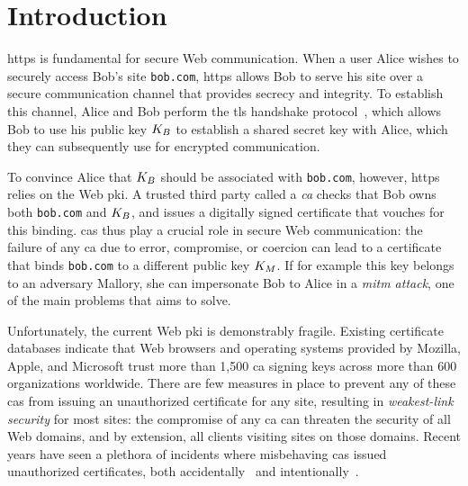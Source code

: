 \section{Introduction}
\label{sec:intro}


\acs{https} is fundamental for secure Web communication. When a user Alice
wishes to securely access Bob's site \texttt{bob.com}, \ac{https} allows Bob to
serve his site over a secure communication channel that provides secrecy and
integrity. To establish this channel, Alice and Bob perform the \ac{tls}
handshake protocol~\cite{rfc5246}, which allows Bob to use his public key
$K_B$ to establish a shared secret key with Alice, which they can subsequently
use for encrypted communication.

To convince Alice that $K_B$ should be associated with \texttt{bob.com},
however, \ac{https} relies on the Web \ac{pki}. A trusted third party called a
\emph{\ac{ca}} checks that Bob owns both \texttt{bob.com} and $K_B$, and
issues a digitally signed certificate that vouches for this binding. \acp{ca}
thus play a crucial role in secure Web communication: the failure of any \ac{ca}
due to error, compromise, or coercion can lead to a certificate that binds
\texttt{bob.com} to a different public key $K_M$. If for example this key
belongs to an adversary Mallory, she can impersonate Bob to Alice in a
\emph{\ac{mitm} attack}, one of the main problems that  aims to solve.

Unfortunately, the current Web \ac{pki} is demonstrably fragile. Existing
certificate databases indicate that Web browsers and operating systems provided
by Mozilla, Apple, and Microsoft trust more than 1,500 \ac{ca} signing keys
across more than 600 organizations worldwide. There are few measures in place to
prevent any of these \acp{ca} from issuing an unauthorized certificate for any
site, resulting in \emph{weakest-link security} for most sites: the compromise
of any \ac{ca} can threaten the security of all Web domains, and by extension,
all clients visiting sites on those domains. Recent years have seen a plethora
of incidents where misbehaving \acp{ca} issued unauthorized certificates, both
accidentally~\cite{sleevi2015sustaining} and
intentionally~\cite{valsorda2015komodia}.

